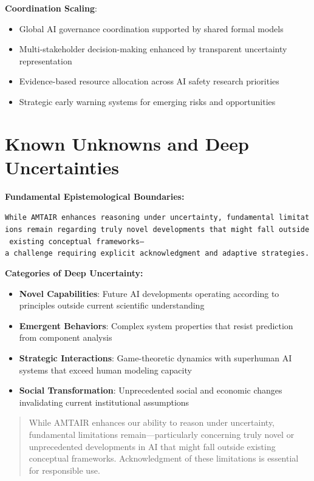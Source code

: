 \documentclass[
  11pt,
  letterpaper,
]{book}
\providecommand{\tightlist}{%
  \setlength{\itemsep}{0pt}\setlength{\parskip}{0pt}}
\begin{document}
\textbf{Coordination Scaling}:

\begin{itemize}
\tightlist
\item
  Global AI governance coordination supported by shared formal models
\item
  Multi-stakeholder decision-making enhanced by transparent uncertainty
  representation
\item
  Evidence-based resource allocation across AI safety research
  priorities
\item
  Strategic early warning systems for emerging risks and opportunities
\end{itemize}

\section{Known Unknowns and Deep
Uncertainties}\label{sec-deep-uncertainties}

\textbf{Fundamental Epistemological Boundaries:}

\texttt{While\ AMTAIR\ enhances\ reasoning\ under\ uncertainty,\ fundamental\ limitations\ remain\ regarding\ truly\ novel\ developments\ that\ might\ fall\ outside\ existing\ conceptual\ frameworks—a\ challenge\ requiring\ explicit\ acknowledgment\ and\ adaptive\ strategies.}

\textbf{Categories of Deep Uncertainty:}

\begin{itemize}
\tightlist
\item
  \textbf{Novel Capabilities}: Future AI developments operating
  according to principles outside current scientific understanding
\item
  \textbf{Emergent Behaviors}: Complex system properties that resist
  prediction from component analysis
\item
  \textbf{Strategic Interactions}: Game-theoretic dynamics with
  superhuman AI systems that exceed human modeling capacity
\item
  \textbf{Social Transformation}: Unprecedented social and economic
  changes invalidating current institutional assumptions
\end{itemize}

\begin{quote}
While AMTAIR enhances our ability to reason under uncertainty,
fundamental limitations remain---particularly concerning truly novel or
unprecedented developments in AI that might fall outside existing
conceptual frameworks. Acknowledgment of these limitations is essential
for responsible use.
\end{quote}
\end{document}
